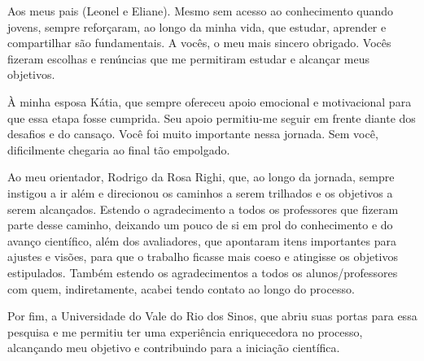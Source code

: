 \documentclass[twoside,english,brazilian]{UNISINOSmonografia}
\begin{document}
\capa
\folhaderosto
\folhadeaprovacao %

\begin{agradecimentos}
Aos meus pais (Leonel e Eliane). Mesmo sem acesso ao conhecimento quando jovens, sempre reforçaram, ao longo da minha vida, que estudar, aprender e compartilhar são fundamentais. A vocês, o meu mais sincero obrigado. Vocês fizeram escolhas e renúncias que me permitiram estudar e alcançar meus objetivos.

À minha esposa Kátia, que sempre ofereceu apoio emocional e motivacional para que essa etapa fosse cumprida. Seu apoio permitiu-me seguir em frente diante dos desafios e do cansaço. Você foi muito importante nessa jornada. Sem você, dificilmente chegaria ao final tão empolgado.

Ao meu orientador, Rodrigo da Rosa Righi, que, ao longo da jornada, sempre instigou a ir além e direcionou os caminhos a serem trilhados e os objetivos a serem alcançados. Estendo o agradecimento a todos os professores que fizeram parte desse caminho, deixando um pouco de si em prol do conhecimento e do avanço científico, além dos avaliadores, que apontaram itens importantes para ajustes e visões, para que o trabalho ficasse mais coeso e atingisse os objetivos estipulados. Também estendo os agradecimentos a todos os alunos/professores com quem, indiretamente, acabei tendo contato ao longo do processo.

Por fim, a Universidade do Vale do Rio dos Sinos, que abriu suas portas para essa pesquisa e me permitiu ter uma experiência enriquecedora no processo, alcançando meu objetivo e contribuindo para a iniciação científica.
\end{agradecimentos}
\end{document}
